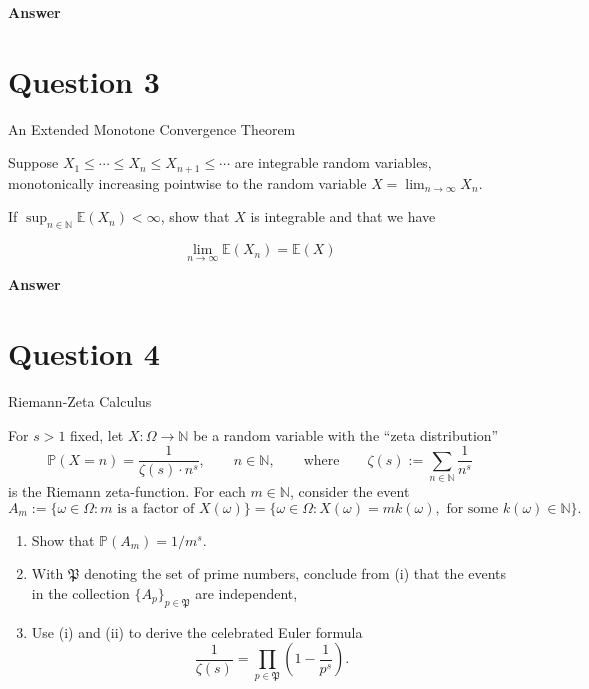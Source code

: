 \documentclass[letterpaper]{article}
\begin{document}
		
		\textbf{Answer}
		
		\clearpage
		
		\section{Question 3}
		
		{\color{deepred} An Extended Monotone Convergence Theorem}
		
		Suppose $X_{1} \leq \cdots \leq X_{n} \leq X_{n+1} \leq \cdots$ are integrable random variables, monotonically increasing pointwise to the random variable $X=\lim _{n \rightarrow \infty} X_{n}$.
		
		If $\sup _{n \in \mathbb{N}} \mathbb{E}\left(X_{n}\right)<\infty$, show that $X$ is integrable and that we have
		
		$$
		\lim _{n \rightarrow \infty} \mathbb{E}\left(X_{n}\right)=\mathbb{E}(X)
		$$
		
		
		\textbf{Answer}
		
		\clearpage
		
		\section{Question 4}
		
		{\color{deepred} Riemann-Zeta Calculus} 
		
		For $s>1$ fixed, let $X:\Omega\to\mathbb{N}$ be a random variable with the ``zeta distribution''
		\[
		\mathbb{P}(X=n)=\frac{1}{\zeta(s)\cdot n^{s}}, \qquad n\in\mathbb{N}, 
		\qquad \text{where} \qquad 
		\zeta(s):=\sum_{n\in\mathbb{N}}\frac{1}{n^{s}}
		\]
		is the Riemann zeta-function. For each $m\in\mathbb{N}$, consider the event
		\[
		A_m:=\{\omega\in\Omega: m \text{ is a factor of } X(\omega)\}
		=\{\omega\in\Omega: X(\omega)=m k(\omega), \text{ for some } k(\omega)\in\mathbb{N}\}.
		\]
		
		\begin{enumerate}
			\item[(i)] Show that $\mathbb{P}(A_m)=1/m^{s}$.
			
			\item[(ii)] With $\mathfrak{P}$ denoting the set of prime numbers, conclude from (i) that the events in the collection $\{A_p\}_{p\in\mathfrak{P}}$ are independent,
			
			\item[(iii)] Use (i) and (ii) to derive the celebrated Euler formula
			\[
			\frac{1}{\zeta(s)}=\prod_{p\in\mathfrak{P}}\left(1-\frac{1}{p^{s}}\right).
			\]
		\end{enumerate}
		
\end{document}
